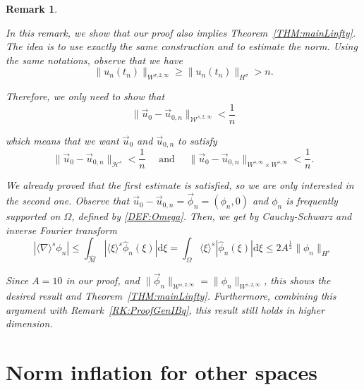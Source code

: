 \documentclass[letterpaper, 11pt,  reqno]{amsart}
\newtheorem{remark}[theorem]{Remark}
\newcommand{\1}{\hspace{0.5mm}\text{I}\hspace{0.5mm}}
\newcommand{\noi}{\noindent}
\newcommand{\M}{\mathcal{M}}
\renewcommand{\H}{\mathcal{H}}
\newcommand{\nb}{\nabla}
\newcommand{\s}{\sigma}
\renewcommand{\O}{\Omega}
\newcommand{\jb}[1]
{\langle #1 \rangle}
\newcommand{\W}{\mathcal{W}}
\numberwithin{equation}{section}
\numberwithin{theorem}{section}
\begin{document}
\begin{remark}\rm
\label{REM:NIinWs2infty}

In this remark, we show that our proof also implies Theorem~\ref{THM:mainLinfty}. The idea is to use exactly the same construction and to estimate the norm. Using the same notations, observe that we have
$$
\| u_n (t_n) \|_{W^{\s, 2, \infty}}  \geq \| u_n (t_n) \|_{H^\s} > n.
$$


\noi Therefore, we only need to show that 
$$
\| \vec{u}_0 - \vec{u}_{0,n} \|_{\W^{s,2,\infty}} < \frac 1n
$$

\noi which means that we want $\vec{u}_{0}$ and $\vec{u}_{0,n}$ to satisfy
$$
\| \vec{u}_0 - \vec{u}_{0,n} \|_{\H^{s}} < \frac 1n \quad \text{ and } \quad \| \vec{u}_0 - \vec{u}_{0,n} \|_{W^{s,\infty} \times W^{s,\infty}} < \frac 1n.
$$

\noi We already proved that the first estimate is satisfied, so we are only interested in the second one. Observe that $\vec{u}_0 - \vec{u}_{0,n} = \vec{\phi}_n = (\phi_n , 0)$ and $\phi_n$ is frequently supported on $\O$, defined by \eqref{DEF:Omega}. Then, we get by Cauchy-Schwarz and inverse Fourier transform
$$
| \jb{\nb}^s \phi_n | \leq \int_{\widehat{\M}} | \jb{\xi}^s \widehat{\phi}_n (\xi)| \mathrm{d}\xi = \int_{\O} \jb{\xi}^s |\widehat{\phi}_n (\xi)| \mathrm{d}\xi \leq 2A^{\frac 12} \| \phi_n \|_{H^s}
$$

\noi Since $A = 10$ in our proof, and $\| \vec{\phi}_n \|_{\W^{s, 2, \infty}} = \| \phi_n \|_{W^{s, 2, \infty}}$, this shows the desired result and Theorem~\ref{THM:mainLinfty}. Furthermore, combining this argument with Remark~\ref{RK:ProofGenIBq}, this result still holds in higher dimension.

\end{remark}

\appendix

\section{Norm inflation for other spaces}
\label{appendixA}
\end{document}
